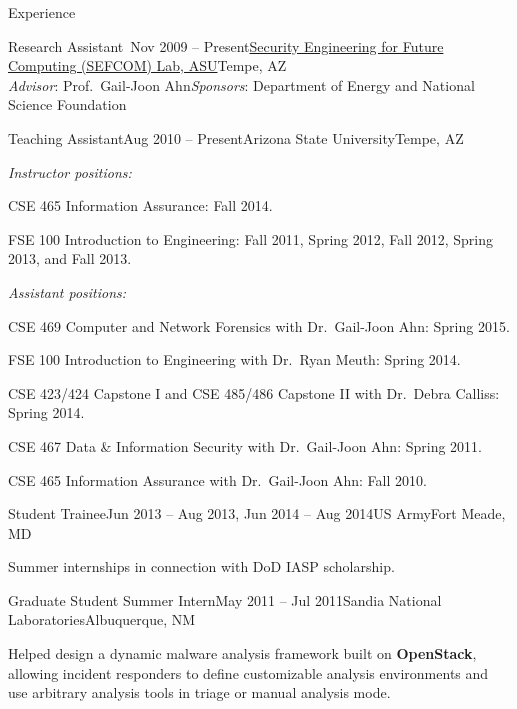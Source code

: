 \documentclass{resume} %
\begin{document}
\begin{rSection}{Experience}
\begin{rExperienceBullets}{Research Assistant~}{Nov 2009 -- Present}{\href{http://sefcom.asu.edu/}{Security Engineering for Future Computing (SEFCOM) Lab, ASU}}{Tempe, AZ\\{\textnormal{\textit{Advisor}: Prof.\ Gail-Joon Ahn\hfill \textit{Sponsors}: Department of Energy and National Science Foundation}}}
\end{rExperienceBullets}


\begin{rExperienceHeader}{Teaching Assistant}{Aug 2010 -- Present}{Arizona State University}{Tempe, AZ}

	\emph{Instructor positions:}
	\begin{rBulletList}
		\item CSE 465 Information Assurance: Fall 2014.
		\item FSE 100 Introduction to Engineering: Fall 2011, Spring 2012, Fall 2012, Spring 2013, and Fall 2013.
	\end{rBulletList}

	\emph{Assistant positions:}
	\begin{rBulletList}
		\item CSE 469 Computer and Network Forensics with Dr.\ Gail-Joon Ahn: Spring 2015.
		\item FSE 100 Introduction to Engineering with Dr.\ Ryan Meuth: Spring 2014.
		\item CSE 423/424 Capstone I and CSE 485/486 Capstone II with Dr.\ Debra Calliss: Spring 2014.
		\item CSE 467 Data \& Information Security with Dr.\ Gail-Joon Ahn: Spring 2011.
		\item CSE 465 Information Assurance with Dr.\ Gail-Joon Ahn: Fall 2010.
	\end{rBulletList}

\end{rExperienceHeader}


\begin{rExperienceBullets}{Student Trainee}{Jun 2013 -- Aug 2013, Jun 2014 -- Aug 2014}{US Army}{Fort Meade, MD}

	\item Summer internships in connection with DoD IASP scholarship.

\end{rExperienceBullets}

\clearpage

\begin{rExperienceBullets}{Graduate Student Summer Intern}{May 2011 -- Jul 2011}{Sandia National Laboratories}{Albuquerque, NM}

	\item Helped design a dynamic malware analysis framework built on \textbf{OpenStack}, allowing incident responders to define customizable analysis environments and use arbitrary analysis tools in triage or manual analysis mode.


\end{rExperienceBullets}
\end{rSection}
\end{document}

